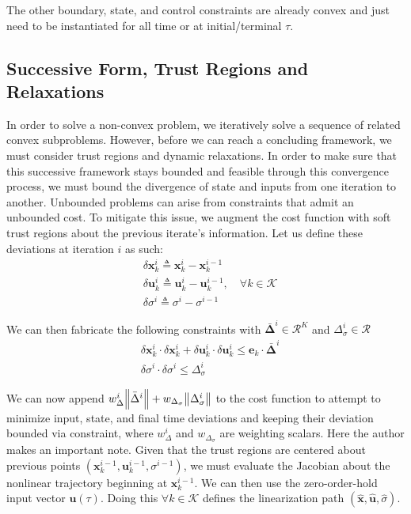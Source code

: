 \documentclass[conf]{new-aiaa}
\begin{document}
\begin{singlespace}
The other boundary, state, and control constraints are already convex and just need to be instantiated for all time or at initial/terminal $\tau$.


\subsection{Successive Form, Trust Regions and Relaxations}
In order to solve a non-convex problem, we iteratively solve a sequence of related convex subproblems. However, before we can reach a concluding framework, we must consider trust regions and dynamic relaxations. In order to make sure that this successive framework stays bounded and feasible through this convergence process, we must bound the divergence of state and inputs from one iteration to another. Unbounded problems can arise from constraints that admit an unbounded cost. To mitigate this issue, we augment the cost function with soft trust regions about the previous iterate's information. Let us define these deviations at iteration $i$ as such:
\begin{align}
& \delta \mathbf{x}_k^i \triangleq \mathbf{x}_k^i - \mathbf{x}_k^{i-1} \\
& \delta \mathbf{u}_k^i \triangleq \mathbf{u}_k^i - \mathbf{u}_k^{i-1}, \quad \forall k \in \mathcal{K}\\
& \delta \sigma^i \triangleq \sigma^i - \sigma^{i-1}
\end{align}

We can then fabricate the following constraints with $\bm{\bar{\Delta}}^i \in \mathcal{R}^K$ and $\Delta_\sigma^i \in \mathcal{R}$
\begin{align}
& \delta \mathbf{x}_k^i \cdot \delta \mathbf{x}_k^i + \delta \mathbf{u}_k^i \cdot \delta \mathbf{u}_k^i \leq \mathbf{e}_k \cdot \bm{\bar{\Delta}}^i \\
& \delta \sigma^i \cdot \delta \sigma^i \leq \Delta_\sigma^i
\end{align}

We can now append $w_\Delta^i \norm{{\bar{\Delta}}^i} + w_{\Delta_\sigma}\norm{\Delta_\sigma^i}$ to the cost function to attempt to minimize input, state, and final time deviations and keeping their deviation bounded via constraint, where $w_\Delta^i$ and $w_{\Delta_\sigma}$ are weighting scalars.
Here the author makes an important note. Given that the trust regions are centered about previous points $(\mathbf{x}_{k}^{i-1},\mathbf{u}_{k}^{i-1},\sigma^{i-1})$, we must evaluate the Jacobian about the nonlinear trajectory beginning at $\mathbf{x}_{k}^{i-1}$. We can then use the zero-order-hold input vector $\mathbf{u}(\tau)$. Doing this $\forall k \in \mathcal{K}$ defines the linearization path $(\hat{\mathbf{x}}, \hat{\mathbf{u}}, \hat{\sigma})$.


\end{singlespace}
\end{document}
